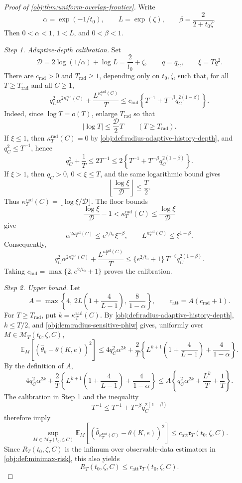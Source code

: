 \begin{proof}[Proof of \cref{obj:thm:uniform-overlap-frontier}]
Write
\[
\alpha=\exp(-1/t_0),\qquad L=\exp(\zeta),\qquad
\beta=\frac{2}{2+t_0\zeta}.
\]
Then \(0<\alpha<1\), \(1<L\), and \(0<\beta<1\).

\emph{Step 1. Adaptive-depth calibration.}
Set
\[
\mathcal D=2\log(1/\alpha)+\log L=\frac{2}{t_0}+\zeta,
\qquad
q=q_C,\qquad \xi=Tq^2 .
\]
There are \(c_{\mathrm{rad}}>0\) and \(T_{\mathrm{rad}}\ge1\), depending only on
\(t_0,\zeta\), such that, for all \(T\ge T_{\mathrm{rad}}\) and all \(C\ge1\),
\[
q_C^2\alpha^{2\kappa_T^{\mathrm{rad}}(C)}
+\frac{L^{\kappa_T^{\mathrm{rad}}(C)}}{T}
\le
c_{\mathrm{rad}}
\left\{
T^{-1}+T^{-\beta}q_C^{2(1-\beta)}
\right\}.
\]
Indeed, since \(\log T=o(T)\), enlarge \(T_{\mathrm{rad}}\) so that
\[
|\log T|\le \frac{\mathcal D}{2}T
\qquad (T\ge T_{\mathrm{rad}}).
\]
If \(\xi\le1\), then \(\kappa_T^{\mathrm{rad}}(C)=0\) by
\cref{obj:def:radius-adaptive-history-depth}, and \(q_C^2\le T^{-1}\), hence
\[
q_C^2+\frac1T
\le
2T^{-1}
\le
2\left\{
T^{-1}+T^{-\beta}q_C^{2(1-\beta)}
\right\}.
\]
If \(\xi>1\), then \(q_C>0\), \(0<\xi\le T\), and the same logarithmic bound gives
\[
\left\lfloor\frac{\log \xi}{\mathcal D}\right\rfloor\le \frac T2 .
\]
Thus \(\kappa_T^{\mathrm{rad}}(C)=\lfloor\log\xi/\mathcal D\rfloor\). The floor
bounds
\[
\frac{\log\xi}{\mathcal D}-1
<
\kappa_T^{\mathrm{rad}}(C)
\le
\frac{\log\xi}{\mathcal D}
\]
give
\[
\alpha^{2\kappa_T^{\mathrm{rad}}(C)}
\le
e^{2/t_0}\xi^{-\beta},
\qquad
L^{\kappa_T^{\mathrm{rad}}(C)}
\le
\xi^{1-\beta}.
\]
Consequently,
\[
q_C^2\alpha^{2\kappa_T^{\mathrm{rad}}(C)}
+\frac{L^{\kappa_T^{\mathrm{rad}}(C)}}{T}
\le
\{e^{2/t_0}+1\}\,T^{-\beta}q_C^{2(1-\beta)}.
\]
Taking \(c_{\mathrm{rad}}=\max\{2,e^{2/t_0}+1\}\) proves the calibration. %

\emph{Step 2. Upper bound.}
Let
\[
A=\max\left\{
4,\,
2L\left(1+\frac4{L-1}\right),\,
\frac8{1-\alpha}
\right\},
\qquad
c_{\mathrm{att}}=A(c_{\mathrm{rad}}+1).
\]
For \(T\ge T_{\mathrm{rad}}\), put \(k=\kappa_T^{\mathrm{rad}}(C)\).  By
\cref{obj:def:radius-adaptive-history-depth}, \(k\le T/2\), and
\cref{obj:lem:radius-sensitive-phiw} gives, uniformly over
\(M\in\mathcal M_T(t_0,\zeta,C)\),
\[
\mathbb E_M[(\widehat\theta_k-\theta(K,e))^2]
\le
4q_C^2\alpha^{2k}
+\frac2T\left\{
L^{k+1}\left(1+\frac4{L-1}\right)+\frac4{1-\alpha}
\right\}.
\]
By the definition of \(A\),
\[
4q_C^2\alpha^{2k}
+\frac2T\left\{
L^{k+1}\left(1+\frac4{L-1}\right)+\frac4{1-\alpha}
\right\}
\le
A\left\{
q_C^2\alpha^{2k}+\frac{L^k}{T}+\frac1T
\right\}.
\]
The calibration in Step 1 and the inequality
\[
T^{-1}\le T^{-1}+T^{-\beta}q_C^{2(1-\beta)}
\]
therefore imply
\[
\sup_{M\in\mathcal M_T(t_0,\zeta,C)}
\mathbb E_M[(\widehat\theta_{\kappa_T^{\mathrm{rad}}(C)}-\theta(K,e))^2]
\le
c_{\mathrm{att}}\mathfrak r_T(t_0,\zeta,C).
\]
Since \(R_T(t_0,\zeta,C)\) is the infimum over observable-data estimators in
\cref{obj:def:minimax-risk}, this also yields
\[
R_T(t_0,\zeta,C)\le c_{\mathrm{att}}\mathfrak r_T(t_0,\zeta,C).
\] %


\end{proof}
